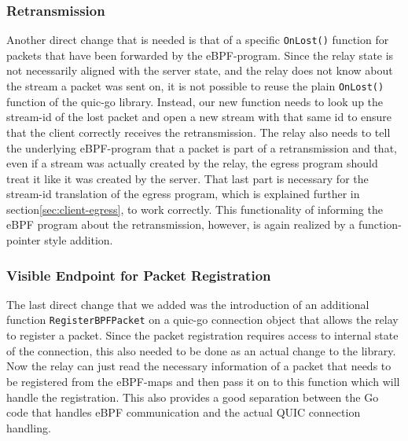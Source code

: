 \subsubsection*{Retransmission}
Another direct change that is needed is that of a specific \verb|OnLost()| function for packets that 
have been forwarded by the eBPF-program.
Since the relay state is not necessarily aligned with the server state, and the relay does not know
about the stream a packet was sent on, it is not possible to reuse the plain \verb|OnLost()| function
of the quic-go library.
Instead, our new function needs to look up the stream-id of the lost packet and open a new stream with
that same id to ensure that the client correctly receives the retransmission.
The relay also needs to tell the underlying eBPF-program that a packet is part of a retransmission and 
that, even if a stream was actually created by the relay, the egress program should treat it like it was
created by the server.
That last part is necessary for the stream-id translation of the egress program, which is explained further
in section\nobreakspace\ref{sec:client-egress}, to work correctly.
This functionality of informing the eBPF program about the retransmission, however, is again realized by a 
function-pointer style addition.

\subsubsection*{Visible Endpoint for Packet Registration}
The last direct change that we added was the introduction of an additional function \verb|RegisterBPFPacket| 
on a quic-go connection object that allows the relay to register a packet.
Since the packet registration requires access to internal state of the connection, this also needed to be 
done as an actual change to the library.
Now the relay can just read the necessary information of a packet that needs to be registered
from the eBPF-maps and then pass it on to this function which will handle the registration.
This also provides a good separation between the Go code that handles eBPF communication and the actual
QUIC connection handling.